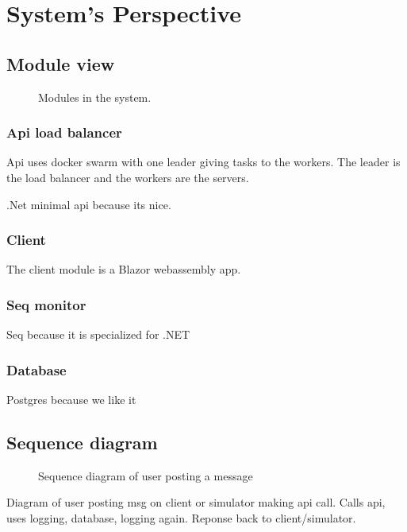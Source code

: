 \section{System's Perspective}
\label{ch:sys_persp} %

\subsection{Module view}

\begin{figure}[H]
    \centering
    \caption{Modules in the system.}
    \label{fig:modules}
\end{figure}

\subsubsection{Api load balancer}

Api uses docker swarm with one leader giving tasks 
to the workers. The leader is the load balancer 
and the workers are the servers. 

.Net minimal api because its nice.

\subsubsection{Client}

The client module is a Blazor webassembly app.

\subsubsection{Seq monitor}

Seq\cite{seq} because it is specialized for .NET

\subsubsection{Database}

Postgres because we like it


\subsection{Sequence diagram}
\begin{figure}[H]
    \centering
    
    \caption{Sequence diagram of user posting a message}
    \label{fig:seq_diagram}
\end{figure}

Diagram of user posting msg on client or simulator making api call. 
Calls api, uses logging, database, logging again. Reponse back to client/simulator.

\begin{figure}[H]
    \centering
    \caption{}
    \label{fig:sequence_diagram}
\end{figure}

